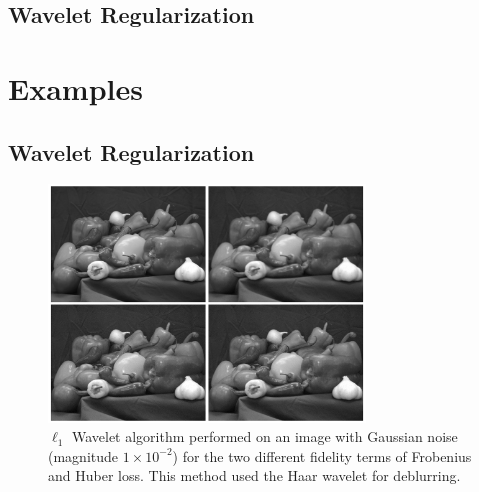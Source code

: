 \documentclass[10pt,a4paper]{article}
\begin{document}
\subsection{Wavelet Regularization}

\section{Examples}

\subsection{Wavelet Regularization}


\begin{figure}[H]
\begin{center}
\includegraphics[width = 0.75\textwidth]{../figures/waveletGaussH.pdf} 
\end{center}
\caption{$\ell_1$ Wavelet algorithm performed on an image with Gaussian noise (magnitude $1 \times 10^{-2}$) for the two different fidelity terms of Frobenius and Huber loss. This method used the Haar wavelet for deblurring.}
\label{waveletH_gauss}
\end{figure}
\end{document}
